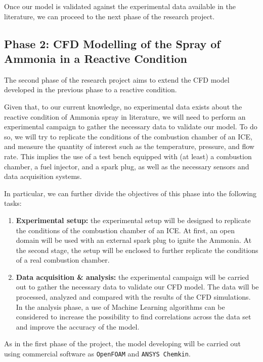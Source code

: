 Once our model is validated against the experimental data available in the literature, we can proceed to the next phase of the research project.

\subsection{Phase 2: CFD Modelling of the Spray of Ammonia in a Reactive Condition}

The second phase of the research project aims to extend the CFD model developed in the previous phase to a reactive condition.

Given that, to our current knowledge, no experimental data exists about the reactive condition of Ammonia spray in literature, we will need to perform an experimental campaign to gather the necessary data to validate our model.
To do so, we will try to replicate the conditions of the combustion chamber of an ICE, and measure the quantity of interest such as the temperature, pressure, and flow rate.
This implies the use of a test bench equipped with (at least) a combustion chamber, a fuel injector, and a spark plug, as well as the necessary sensors and data acquisition systems.

In particular, we can further divide the objectives of this phase into the following tasks:

\begin{enumerate}
    \item \textbf{Experimental setup:} the experimental setup will be designed to replicate the conditions of the combustion chamber of an ICE. At first, an open domain will be used with an external spark plug to ignite the Ammonia. At the second stage, the setup will be enclosed to further replicate the conditions of a real combustion chamber.
    \item \textbf{Data acquisition \& analysis:} the experimental campaign will be carried out to gather the necessary data to validate our CFD model. The data will be processed, analyzed and compared with the results of the CFD simulations. In the analysis phase, a use of Machine Learning algorithms can be considered to increase the possibility to find correlations across the data set and improve the accuracy of the model.
\end{enumerate}

As in the first phase of the project, the model developing will be carried out using commercial software as \texttt{OpenFOAM} and \texttt{ANSYS Chemkin}.

